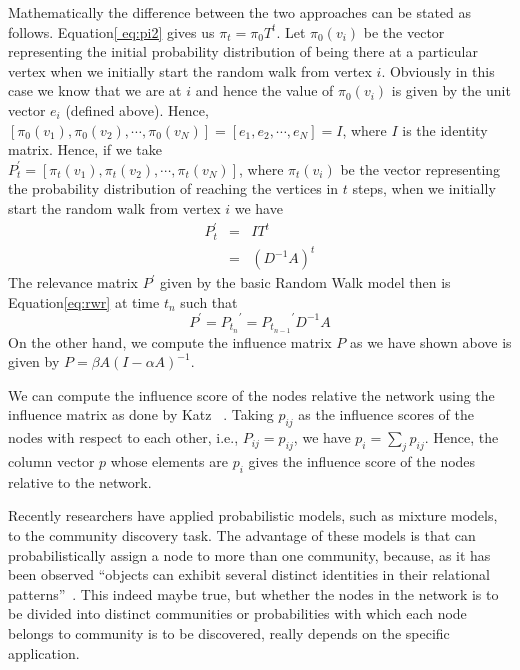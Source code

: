 \documentclass{sig-alternate}
\begin{document}
Mathematically the difference between the two approaches can be stated as follows. Equation\eqref{ eq:pi2} gives us
$\pi_t = \pi_0T^t$.
Let $\pi_{0}(v_i)$ be the vector representing the initial probability distribution  of being there at a particular vertex  when we initially start the random walk from vertex $i$. Obviously in this case we know that we are at $i$ and hence the value of  $\pi_{0}(v_i) $ is given by the unit vector $e_i$ (defined above).
Hence, \\
$[\pi_{0}(v_1), \pi_{0}(v_2), \cdots ,  \pi_{0}(v_N)] =[e_1,e_2,\cdots,e_N]= I$,
where $I$ is the identity matrix.
Hence, if we take \\ $P_t^{'} =[\pi_{t}(v_1), \pi_{t}(v_2), \cdots ,  \pi_{t}(v_N)]$,  where $\pi_{t}(v_i)$ be the vector representing the probability distribution  of reaching the vertices in $t$ steps, when we initially start the random walk from vertex $i$ we have
\begin{eqnarray}
\label {eq:rwr}
P_t^{\prime} & = &I{T^t} \\
& =& {(D^{-1}A)}^{t} 
\end{eqnarray}
The relevance matrix $P^{\prime}$ given by the basic Random Walk model then is Equation\eqref{eq:rwr} at time $t_n$ such that
\begin{equation}
P^{\prime}={P_{t_n}}^{\prime} ={P_{t_{n-1}}}^{\prime} {D^{-1}A}
\end{equation}
On the other hand, we compute the influence matrix $P$  as we have shown above is given by
$P = \beta A {( I-\alpha A)}^{-1}$.

We can compute the  influence score of the nodes relative the network  using  the influence matrix as done by Katz ~\cite{Katz}. Taking $p_{ij}$ as the influence scores of the nodes with respect to each other, i.e., $P_{ij} =p_{ij}$, we have $p_i = \sum_{j} p_{ij}$. Hence, the column vector $p$ whose elements are $p_i$ gives the influence score of the nodes relative to the network.




Recently researchers have applied probabilistic models, such as mixture models, to the community discovery task. The advantage of these models is that can probabilistically assign a node to more than one community, because, as it has been observed ``objects can exhibit several distinct identities in their relational patterns''~\cite{Airoldi,tina}. This indeed maybe true, but whether the nodes in the network is to be divided into distinct communities or probabilities with which each node belongs to  community is to be discovered, really depends on the specific application. 
\end{document}
